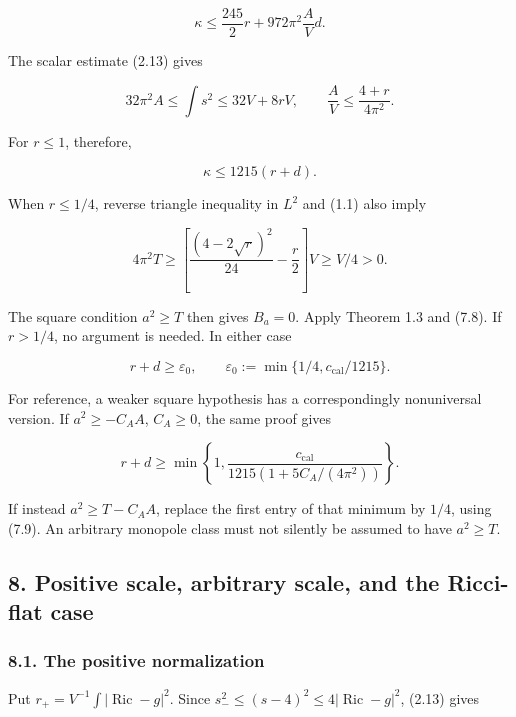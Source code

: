 \documentclass[
  10pt,
]{article}
\begin{document}
\[
                     \kappa\le\frac{245}{2}r
                                      +972\pi^2\frac AVd.
 \tag{7.6}
\]

The scalar estimate (2.13) gives

\[
 32\pi^2A\le\int s^2\le32V+8rV,
              \qquad \frac AV\le\frac{4+r}{4\pi^2}.
 \tag{7.7}
\]

For \(r\le1\), therefore,

\[
                              \kappa\le1215(r+d).        \tag{7.8}
\]

When \(r\le1/4\), reverse triangle inequality in \(L^2\) and (1.1) also
imply

\[
 4\pi^2T
     \ge\left[\frac{(4-2\sqrt r)^2}{24}-\frac r2\right]V
     \ge V/4>0.                                          \tag{7.9}
\]

The square condition \(a^2\ge T\) then gives \(B_a=0\). Apply Theorem
1.3 and (7.8). If \(r>1/4\), no argument is needed. In either case

\[
       r+d\ge\varepsilon_0,
       \qquad \varepsilon_0:=\min\{1/4,c_{\mathrm{cal}}/1215\}.
 \tag{7.10}
\]

For reference, a weaker square hypothesis has a correspondingly
nonuniversal version. If \(a^2\ge-C_AA\), \(C_A\ge0\), the same proof
gives

\[
 r+d\ge\min\left\{1,
          \frac{c_{\mathrm{cal}}}{1215(1+5C_A/(4\pi^2))}\right\}.
 \tag{7.11}
\]

If instead \(a^2\ge T-C_AA\), replace the first entry of that minimum by
\(1/4\), using (7.9). An arbitrary monopole class must not silently be
assumed to have \(a^2\ge T\).

\hypertarget{positive-scale-arbitrary-scale-and-the-ricci-flat-case}{%
\subsection{8. Positive scale, arbitrary scale, and the Ricci-flat
case}\label{positive-scale-arbitrary-scale-and-the-ricci-flat-case}}

\hypertarget{the-positive-normalization}{%
\subsubsection{8.1. The positive
normalization}\label{the-positive-normalization}}

Put \(r_+=V^{-1}\int|\operatorname{Ric}-g|^2\). Since
\(s_-^2\le(s-4)^2\le4|\operatorname{Ric}-g|^2\), (2.13) gives
\end{document}
